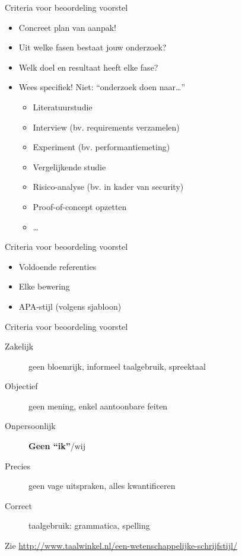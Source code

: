\documentclass[usenames,dvipsnames]{beamer}
\begin{document}
\begin{frame}{Criteria voor beoordeling voorstel}


\begin{itemize}
  \item Concreet plan van aanpak!
  \item Uit welke fasen bestaat jouw onderzoek?
  \item Welk doel en resultaat heeft elke fase?
  \item Wees specifiek! Niet: ``onderzoek doen naar\ldots''
  \begin{itemize}
    \item Literatuurstudie
    \item Interview (bv. requirements verzamelen)
    \item Experiment (bv. performantiemeting)
    \item Vergelijkende studie
    \item Risico-analyse (bv. in kader van security)
    \item Proof-of-concept opzetten
    \item \ldots
  \end{itemize}
\end{itemize}

\end{frame}

\begin{frame}{Criteria voor beoordeling voorstel}


\begin{itemize}
  \item Voldoende referenties
  \item Elke bewering
  \item APA-stijl (volgens sjabloon)
\end{itemize}

\end{frame}

\begin{frame}{Criteria voor beoordeling voorstel}


\begin{description}
  \item[Zakelijk] geen bloemrijk, informeel taalgebruik, spreektaal
  \item[Objectief] geen mening, enkel aantoonbare feiten
  \item[Onpersoonlijk] \textbf{Geen ``ik''}/wij
  \item[Precies] geen vage uitspraken, alles kwantificeren
  \item[Correct] taalgebruik: grammatica, spelling
\end{description}

Zie \url{http://www.taalwinkel.nl/een-wetenschappelijke-schrijfstijl/}

\end{frame}
\end{document}
